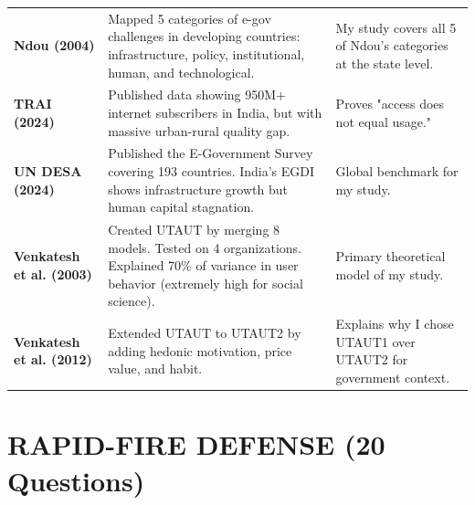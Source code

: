 \documentclass[11pt,a4paper]{article}
\begin{document}
\begin{tabularx}{\textwidth}{>{\bfseries\small}p{3.5cm} >{\small}X >{\small}p{3.8cm}}
Ndou (2004) & Mapped 5 categories of e-gov challenges in developing countries: infrastructure, policy, institutional, human, and technological. & My study covers all 5 of Ndou's categories at the state level. \\
\rowcolor{lightbg}
TRAI (2024) & Published data showing 950M+ internet subscribers in India, but with massive urban-rural quality gap. & Proves "access does not equal usage." \\
UN DESA (2024) & Published the E-Government Survey covering 193 countries. India's EGDI shows infrastructure growth but human capital stagnation. & Global benchmark for my study. \\
\rowcolor{lightbg}
Venkatesh et al. (2003) & Created UTAUT by merging 8 models. Tested on 4 organizations. Explained 70\% of variance in user behavior (extremely high for social science). & Primary theoretical model of my study. \\
Venkatesh et al. (2012) & Extended UTAUT to UTAUT2 by adding hedonic motivation, price value, and habit. & Explains why I chose UTAUT1 over UTAUT2 for government context. \\
\bottomrule
\end{tabularx}

\section{RAPID-FIRE DEFENSE (20 Questions)}
\end{document}
